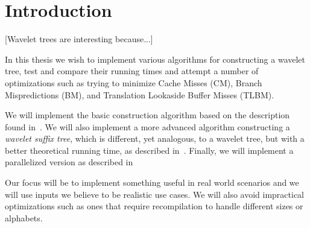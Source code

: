 \section{Introduction}
[Wavelet trees are interesting because...]

In this thesis we wish to implement various algorithms for constructing a wavelet tree, test and compare their running times and attempt a number of optimizations such as trying to minimize Cache Misses (CM), Branch Mispredictions (BM), and Translation Lookaside Buffer Misses (TLBM).

We will implement the basic construction algorithm based on the description found in~\citep{ Navjda13}. 
We will also implement a more advanced algorithm constructing a \textit{wavelet suffix tree}, which is different, yet analogous, to a wavelet tree, but with a better theoretical running time, as described in~\citep{DBLP:journals/corr/BabenkoGKS14}. Finally, we will implement a parallelized version as described in~\citep{DBLP:journals/corr/Shun14}

Our focus will be to implement something useful in real world scenarios and we will use inputs we believe to be realistic use cases.
We will also avoid impractical optimizations such as ones that require recompilation to handle different sizes or alphabets.